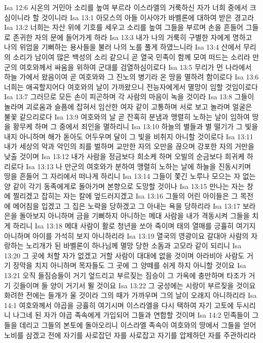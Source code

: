 Isa 12:6  시온의 거민아 소리를 높여 부르라 이스라엘의 거룩하신 자가 너희 중에서 크심이니라 할 것이니라
Isa 13:1  아모스의 아들 이사야가 바벨론에 대하여 받은 경고라
Isa 13:2  너희는 자산 위에 기호를 세우고 소리를 높여 그들을 부르며 손을 흔들어 그들로 존귀한 자의 문에 들어가게 하라
Isa 13:3  내가 나의 거룩히 구별한 자에게 명하고 나의 위엄을 기뻐하는 용사들을 불러 나의 노를 풀게 하였느니라
Isa 13:4  산에서 무리의 소리가 남이여 많은 백성의 소리 같으니 곧 열국 민족이 함께 모여 떠드는 소리라 만군의 여호와께서 싸움을 위하여 군대를 검열하심이로다
Isa 13:5  무리가 먼 나라에서 하늘 가에서 왔음이여 곧 여호와와 그 진노의 병기라 온 땅을 멸하려 함이로다
Isa 13:6  너희는 애곡할지어다 여호와의 날이 가까왔으니 전능자에게서 멸망이 임할 것임이로다
Isa 13:7  그러므로 모든 손이 피곤하며 각 사람의 마음이 녹을 것이라
Isa 13:8  그들이 놀라며 괴로움과 슬픔에 잡혀서 임산한 여자 같이 고통하며 서로 보고 놀라며 얼굴은 불꽃 같으리로다
Isa 13:9  여호와의 날 곧 잔혹히 분냄과 맹렬히 노하는 날이 임하여 땅을 황무케 하며 그 중에서 죄인을 멸하리니
Isa 13:10  하늘의 별들과 별 떨기가 그 빛을 내지 아니하며 해가 돋아도 어두우며 달이 그 빛을 비취지 아니할 것이로다
Isa 13:11  내가 세상의 악과 악인의 죄를 벌하며 교만한 자의 오만을 끊으며 강포한 자의 거만을 낮출 것이며
Isa 13:12  내가 사람을 정금보다 희소케 하며 오빌의 순금보다 희귀케 하리로다
Isa 13:13  나 만군의 여호와가 분하여 맹렬히 노하는 날에 하늘을 진동시키며 땅을 흔들어 그 자리에서 떠나게 하리니
Isa 13:14  그들이 쫓긴 노루나 모으는 자 없는 양 같이 각기 동족에게로 돌아가며 본향으로 도망할 것이나
Isa 13:15  만나는 자는 창에 찔리겠고 잡히는 자는 칼에 엎드러지겠고
Isa 13:16  그들의 어린 아이들은 그 목전에 메어침을 입겠고 그 집은 노략을 당하겠고 그 아내는 욕을 당하리라
Isa 13:17  보라 은을 돌아보지 아니하며 금을 기뻐하지 아니하는 메대 사람을 내가 격동시켜 그들을 치게 하리니
Isa 13:18  메대 사람이 활로 청년을 쏘아 죽이며 태의 열매를 긍휼히 여기지 아니하며 아이를 가석히 보지 아니하리라
Isa 13:19  열국의 영광이요 갈대아 사람의 자랑하는 노리개가 된 바벨론이 하나님께 멸망 당한 소돔과 고모라 같이 되리니
Isa 13:20  그 곳에 처할 자가 없겠고 거할 사람이 대대에 없을 것이며 아라비아 사람도 거기 장막을 치지 아니하며 목자들도 그 곳에 그 양떼를 쉬게 하지 아니할 것이요
Isa 13:21  오직 들짐승들이 거기 엎드리고 부르짖는 짐승이 그 가옥에 충만하며 타조가 거기 깃들이며 들 양이 거기서 뛸 것이요
Isa 13:22  그 궁성에는 시랑이 부르짖을 것이요 화려한 전에는 들개가 울 것이라 그의 때가 가까우며 그의 날이 오래지 아니하리라
Isa 14:1  여호와께서 야곱을 긍휼히 여기시며 이스라엘을 다시 택하여 자기 고토에 두시리니 나그네 된 자가 야곱 족속에게 가입되어 그들과 연합할 것이며
Isa 14:2  민족들이 그들을 데리고 그들의 본토에 돌아오리니 이스라엘 족속이 여호와의 땅에서 그들을 얻어 노비를 삼겠고 전에 자기를 사로잡던 자를 사로잡고 자기를 압제하던 자를 주관하리라
